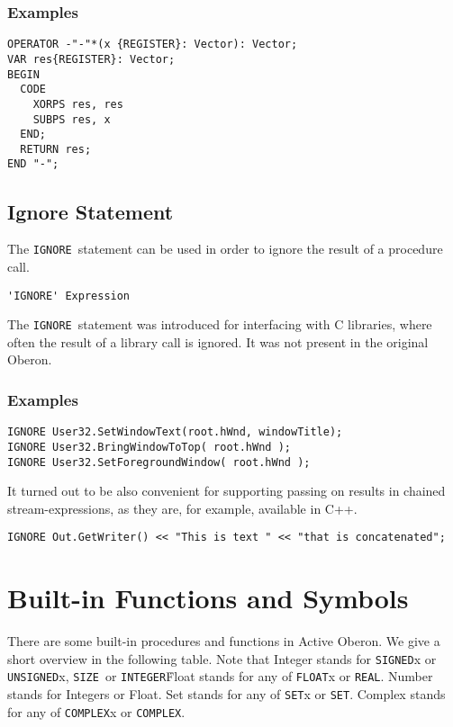 \documentclass[a4wide,11pt]{article}
\newcommand{\IGNORE}{\lstinline"IGNORE"}
\newcommand{\INTEGER}{\lstinline"INTEGER"}
\newcommand{\SIGNED}{\lstinline"SIGNED"}
\newcommand{\UNSIGNED}{\lstinline"UNSIGNED"}
\newcommand{\REAL}{\lstinline"REAL"}
\newcommand{\COMPLEX}{\lstinline"COMPLEX"}
\newcommand{\FLOAT}{\lstinline"FLOAT"}
\newcommand{\SET}{\lstinline"SET"}
\newcommand{\SIZE}{\lstinline"SIZE"}
\begin{document}
\begin{annotation}
\subsubsection{Examples}
\begin{lstlisting}[style=example]
OPERATOR -"-"*(x {REGISTER}: Vector): Vector;
VAR res{REGISTER}: Vector;
BEGIN
  CODE
    XORPS res, res
    SUBPS res, x
  END;
  RETURN res;
END "-";
\end{lstlisting}
\end{annotation}

\subsection{Ignore Statement}
The \IGNORE\ statement can be used in order to ignore the result of a procedure call.

\begin{lstlisting}[style=ebnf]
'IGNORE' Expression
\end{lstlisting}

\begin{annotation}
The \IGNORE\ statement was introduced for interfacing with C libraries, where often the result of a library call is ignored.
It was not present in the original Oberon.

\subsubsection{Examples}
\begin{lstlisting}[style=example]
IGNORE User32.SetWindowText(root.hWnd, windowTitle);
IGNORE User32.BringWindowToTop( root.hWnd );
IGNORE User32.SetForegroundWindow( root.hWnd );
\end{lstlisting}

It turned out to be also convenient for supporting passing on results in chained stream-expressions, as they are, for example, available in C++.
\begin{lstlisting}[style=example]
IGNORE Out.GetWriter() << "This is text " << "that is concatenated";
\end{lstlisting}

\end{annotation}

\section{Built-in Functions and Symbols}
There are some built-in procedures and functions in Active Oberon.
We give a short overview in the following table.
Note that Integer stands for \SIGNED{x} or \UNSIGNED{x}, \SIZE\ or \INTEGER\.
Float stands for any of \FLOAT{x} or \REAL.
Number stands for Integers or Float.
Set stands for any of \SET{x} or \SET.
Complex stands for any of \COMPLEX{x} or \COMPLEX.
\end{document}
